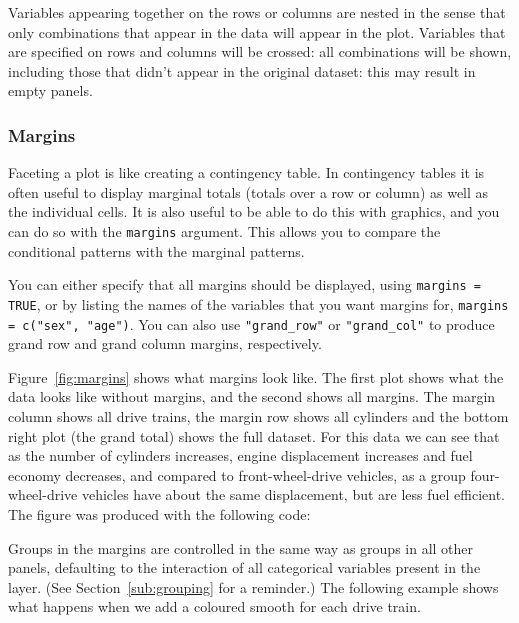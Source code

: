 Variables appearing together on the rows or columns are nested in the sense that only combinations that appear in the data will appear in the plot.  Variables that are specified on rows and columns will be crossed: all combinations will be shown, including those that didn't appear in the original dataset: this may result in empty panels.

\subsubsection{Margins}\label{sub:margins}

Faceting a plot is like creating a contingency table.  In contingency tables it is often useful to display marginal totals (totals over a row or column) as well as the individual cells.  It is also useful to be able to do this with graphics, and you can do so with the {\tt margins} argument.  This allows you to compare the conditional patterns with the marginal patterns.

You can either specify that all margins should be displayed, using {\tt margins = TRUE}, or by listing the names of the variables that you want margins for, {\tt margins = c("sex", "age")}.  You can also use \verb|"grand_row"| or \verb|"grand_col"| to produce grand row and grand column margins, respectively.  

Figure~\ref{fig:margins} shows what margins look like.  The first plot shows what the data looks like without margins, and the second shows all margins.  The margin column shows all drive trains, the margin row shows all cylinders and the bottom right plot (the grand total) shows the full dataset.  For this data we can see that as the number of cylinders increases, engine displacement increases and fuel economy decreases, and compared to front-wheel-drive vehicles, as a group four-wheel-drive vehicles have about the same displacement, but are less fuel efficient.  The figure was produced with the following code:

% 


Groups in the margins are controlled in the same way as groups in all other panels, defaulting to the interaction of all categorical variables present in the layer.  (See Section~\ref{sub:grouping} for a reminder.)  The following example shows what happens when we add a coloured smooth for each drive train. 

